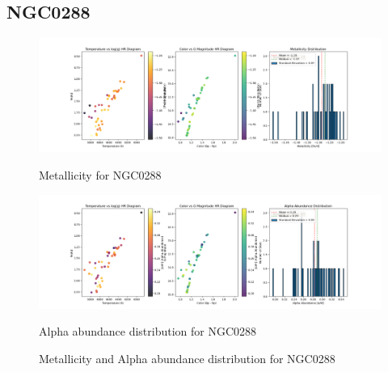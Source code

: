 \documentclass[a4paper,12pt]{article}
\begin{document}
\subsection{NGC0288}
\begin{figure}[H]
    \centering
    \begin{minipage}[b]{0.8\textwidth}
        \centering
        \includegraphics[width=\textwidth]{NGC0288_metalicity.png}
        \caption{Metallicity for NGC0288}
        \label{fig:NGC0288_metalicity}
    \end{minipage}
    \hfill
    \begin{minipage}[b]{0.8\textwidth}
        \centering
        \includegraphics[width=\textwidth]{NGC0288_alpha.png}
        \caption{Alpha abundance distribution for NGC0288}
        \label{fig:NGC0288_alpha}
    \end{minipage}
    \caption{Metallicity and Alpha abundance distribution for NGC0288}
    \label{fig:NGC0288_combined}
\end{figure}
\clearpage
\end{document}
